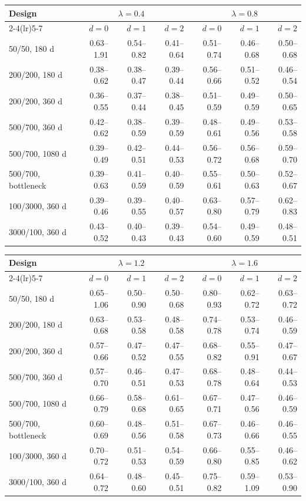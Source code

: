 \begin{center}
\footnotesize
\setlength{\tabcolsep}{3pt}
\begin{tabular}{l*{6}{r}}
\toprule
Design & \multicolumn{3}{c}{$\lambda=0.4$} & \multicolumn{3}{c}{$\lambda=0.8$} \\
\cmidrule(lr){2-4}\cmidrule(lr){5-7}
 & $d=0$ & $d=1$ & $d=2$ & $d=0$ & $d=1$ & $d=2$ \\
\midrule
50/50, 180 d & 0.63--1.91 & 0.54--0.82 & 0.41--0.64 & 0.51--0.74 & 0.46--0.68 & 0.50--0.68 \\
200/200, 180 d & 0.38--0.62 & 0.38--0.47 & 0.39--0.44 & 0.56--0.66 & 0.51--0.52 & 0.46--0.54 \\
200/200, 360 d & 0.36--0.55 & 0.37--0.44 & 0.38--0.45 & 0.51--0.59 & 0.49--0.59 & 0.50--0.65 \\
500/700, 360 d & 0.42--0.62 & 0.38--0.59 & 0.39--0.59 & 0.48--0.61 & 0.49--0.56 & 0.53--0.58 \\
500/700, 1080 d & 0.39--0.49 & 0.42--0.51 & 0.44--0.53 & 0.56--0.72 & 0.56--0.68 & 0.59--0.70 \\
500/700, bottleneck & 0.39--0.63 & 0.41--0.59 & 0.40--0.59 & 0.55--0.61 & 0.50--0.63 & 0.52--0.67 \\
100/3000, 360 d & 0.39--0.46 & 0.39--0.55 & 0.40--0.57 & 0.63--0.80 & 0.57--0.79 & 0.62--0.83 \\
3000/100, 360 d & 0.43--0.52 & 0.40--0.43 & 0.39--0.43 & 0.54--0.60 & 0.49--0.59 & 0.48--0.51 \\
\bottomrule
\end{tabular}
\end{center}

\begin{center}
\footnotesize
\setlength{\tabcolsep}{3pt}
\begin{tabular}{l*{6}{r}}
\toprule
Design & \multicolumn{3}{c}{$\lambda=1.2$} & \multicolumn{3}{c}{$\lambda=1.6$} \\
\cmidrule(lr){2-4}\cmidrule(lr){5-7}
 & $d=0$ & $d=1$ & $d=2$ & $d=0$ & $d=1$ & $d=2$ \\
\midrule
50/50, 180 d & 0.65--1.06 & 0.50--0.90 & 0.50--0.68 & 0.80--0.93 & 0.62--0.72 & 0.63--0.72 \\
200/200, 180 d & 0.63--0.68 & 0.53--0.58 & 0.48--0.58 & 0.74--0.78 & 0.53--0.74 & 0.46--0.59 \\
200/200, 360 d & 0.57--0.66 & 0.47--0.52 & 0.47--0.55 & 0.68--0.82 & 0.55--0.91 & 0.47--0.67 \\
500/700, 360 d & 0.57--0.70 & 0.46--0.51 & 0.47--0.53 & 0.68--0.78 & 0.48--0.64 & 0.44--0.53 \\
500/700, 1080 d & 0.66--0.79 & 0.58--0.68 & 0.61--0.65 & 0.67--0.71 & 0.47--0.56 & 0.46--0.59 \\
500/700, bottleneck & 0.60--0.69 & 0.48--0.56 & 0.51--0.58 & 0.67--0.73 & 0.46--0.66 & 0.46--0.55 \\
100/3000, 360 d & 0.70--0.72 & 0.51--0.53 & 0.54--0.59 & 0.66--0.80 & 0.55--0.85 & 0.46--0.62 \\
3000/100, 360 d & 0.64--0.72 & 0.48--0.60 & 0.45--0.51 & 0.75--0.82 & 0.59--1.09 & 0.53--0.90 \\
\bottomrule
\end{tabular}
\end{center}
